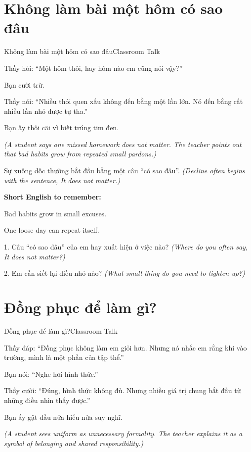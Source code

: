 \section{Không làm bài một hôm có sao đâu}
\begin{truyen}{Không làm bài một hôm có sao đâu}{Classroom Talk}

Thầy hỏi: ``Một hôm thôi, hay hôm nào em cũng nói vậy?''

Bạn cười trừ.

Thầy nói: ``Nhiều thói quen xấu không đến bằng một lần lớn. Nó đến bằng rất nhiều lần nhỏ được tự tha.''

Bạn ấy thôi cãi vì biết trúng tim đen.

\textit{(A student says one missed homework does not matter. The teacher points out that bad habits grow from repeated small pardons.)}
\end{truyen}

\begin{baihoc}
Sự xuống dốc thường bắt đầu bằng một câu ``có sao đâu''.
\textit{(Decline often begins with the sentence, It does not matter.)}
\end{baihoc}

\begin{ghinhoanh}
\textbf{Short English to remember:}

Bad habits grow in small excuses.

One loose day can repeat itself.
\end{ghinhoanh}

\begin{tuhocnhanh}
1. Câu ``có sao đâu'' của em hay xuất hiện ở việc nào? \textit{(Where do you often say, It does not matter?)}

2. Em cần siết lại điều nhỏ nào? \textit{(What small thing do you need to tighten up?)}
\end{tuhocnhanh}
\ngancach

\section{Đồng phục để làm gì?}
\begin{truyen}{Đồng phục để làm gì?}{Classroom Talk}

Thầy đáp: ``Đồng phục không làm em giỏi hơn. Nhưng nó nhắc em rằng khi vào trường, mình là một phần của tập thể.''

Bạn nói: ``Nghe hơi hình thức.''

Thầy cười: ``Đúng, hình thức không đủ. Nhưng nhiều giá trị chung bắt đầu từ những điều nhìn thấy được.''

Bạn ấy gật đầu nửa hiểu nửa suy nghĩ.

\textit{(A student sees uniform as unnecessary formality. The teacher explains it as a symbol of belonging and shared responsibility.)}
\end{truyen}

